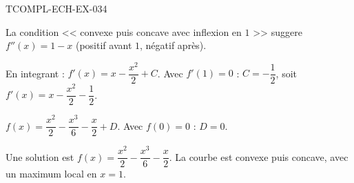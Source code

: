\begin{corrige}{TCOMPL-ECH-EX-034}

La condition << convexe puis concave avec inflexion en $1$ >> suggere $f''(x) = 1 - x$ (positif avant $1$, négatif après).


En integrant : $f'(x) = x - \dfrac{x^2}{2} + C$. Avec $f'(1)=0$ : $C = -\dfrac{1}{2}$, soit $f'(x) = x - \dfrac{x^2}{2} - \dfrac{1}{2}$.

$f(x) = \dfrac{x^2}{2} - \dfrac{x^3}{6} - \dfrac{x}{2} + D$. Avec $f(0)=0$ : $D=0$.

Une solution est $\boxed{f(x) = \dfrac{x^2}{2} - \dfrac{x^3}{6} - \dfrac{x}{2}}$. La courbe est convexe puis concave, avec un maximum local en $x=1$.

\end{corrige}
